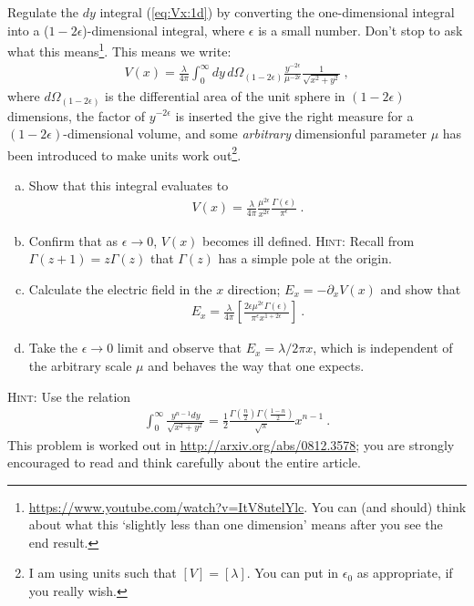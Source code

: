 \documentclass[12pt]{article}
\numberwithin{equation}{subsection}    %
\begin{document}
Regulate the $dy$ integral (\ref{eq:Vx:1d}) by converting the one-dimensional integral into a ($1-2\epsilon$)-dimensional integral, where $\epsilon$ is a small number. Don't stop to ask what this means\footnote{\url{https://www.youtube.com/watch?v=ItV8utelYlc}. You can (and should) think about what this `slightly less than one dimension' means after you see the end result.}. This means we write:
\begin{align}
	V(x) = \frac{\lambda}{4\pi} \int_0^\infty dy\,d\Omega_{(1-2\epsilon)} \frac{y^{-2\epsilon}}{\mu^{-2\epsilon}}\frac{1}{\sqrt{x^2+y^2}} \ ,
\end{align}
where $d\Omega_{(1-2\epsilon)}$ is the differential area of the unit sphere in $(1-2\epsilon)$ dimensions, the factor of $y^{-2\epsilon}$ is inserted the give the right measure for a $(1-2\epsilon)$-dimensional volume, and some \emph{arbitrary} dimensionful parameter $\mu$ has been introduced to make units work out\footnote{I am using units such that $[V] = [\lambda]$. You can put in $\epsilon_0$ as appropriate, if you really wish.}. 
\begin{enumerate}[(a)]
\item Show that this integral evaluates to
\begin{align}
	V(x) = \frac{\lambda}{4\pi} \frac{\mu^{2\epsilon}}{x^{2\epsilon}} \frac{\Gamma(\epsilon)}{\pi^\epsilon} \ .
\end{align}
\item Confirm that as $\epsilon\to 0$, $V(x)$ becomes ill defined. \textsc{Hint}: Recall from $\Gamma(z+1) = z \Gamma(z)$ that $\Gamma(z)$ has a simple pole at the origin.
\item Calculate the electric field in the $x$ direction; $E_x = -\partial_xV(x)$ and show that
\begin{align}
	E_x = \frac{\lambda}{4\pi} \left[ \frac{2\epsilon \mu^{2\epsilon} \Gamma(\epsilon)}{\pi^\epsilon x^{1+2\epsilon}} \right] \ .
\end{align}
\item Take the $\epsilon \to 0$ limit and observe that $E_x = \lambda/2\pi x$, which is independent of the arbitrary scale $\mu$ and behaves the way that one expects. 
\end{enumerate}

\textsc{Hint:} Use the relation
\begin{align}
	\int_0^\infty \frac{y^{n-1}dy}{\sqrt{x^2+y^2}} = \frac{1}{2}\frac{\Gamma(\frac n2)\Gamma(\frac{1-n}2)}{\sqrt{\pi}}x^{n-1} \ .
\end{align}
This problem is worked out in \url{http://arxiv.org/abs/0812.3578}; you are strongly encouraged to read and think carefully about the entire article.
\end{document}
